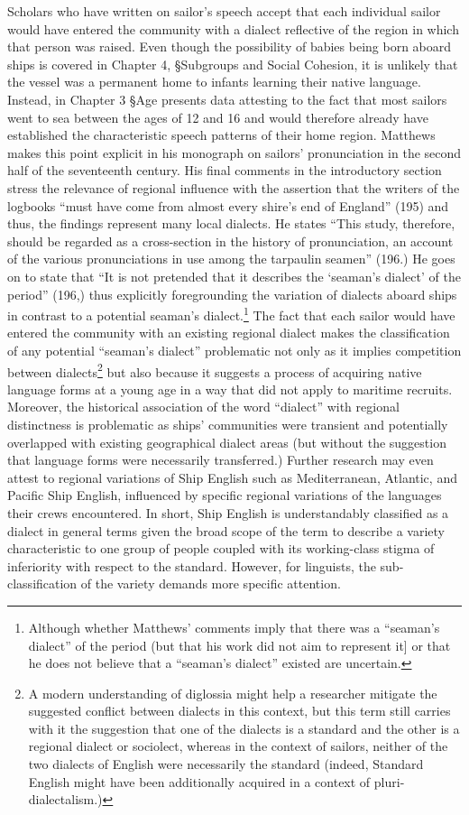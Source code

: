 {Scholars who have written on sailor’s speech accept that each individual sailor would have entered the community with a dialect reflective of the region in which that person was raised.} Even though the possibility of babies being born aboard ships is covered in Chapter 4, §Subgroups and Social Cohesion, it is unlikely that the vessel was a permanent home to infants learning their native language. Instead, in Chapter 3 §Age presents data attesting to the fact that most sailors went to sea between the ages of 12 and 16 and would therefore already have established the characteristic speech patterns of their home region. Matthews makes this point explicit in his monograph on sailors’ pronunciation in the second half of the seventeenth century. His final comments in the introductory section stress the relevance of regional influence with the assertion that the writers of the logbooks “must have come from almost every shire’s end of England” (195) and thus, the findings represent many local dialects. He states “This study, therefore, should be regarded as a cross-section in the history of pronunciation, an account of the various pronunciations in use among the tarpaulin seamen” (196.) He goes on to state that “It is not pretended that it describes the ‘seaman’s dialect’ of the period” (196,) thus explicitly foregrounding the variation of dialects aboard ships in contrast to a potential seaman’s dialect.\footnote{Although whether Matthews’ comments imply that there was a “seaman’s dialect” of the period (but that his work did not aim to represent it] or that he does not believe that a “seaman’s dialect” existed are uncertain.}  The fact that each sailor would have entered the community with an existing regional dialect makes the classification of any potential “seaman’s dialect” problematic not only as it implies competition between dialects\footnote{A modern understanding of diglossia might help a researcher mitigate the suggested conflict between dialects in this context, but this term still carries with it the suggestion that one of the dialects is a standard and the other is a regional dialect or sociolect, whereas in the context of sailors, neither of the two dialects of English were necessarily the standard (indeed, Standard English might have been additionally acquired in a context of pluri-dialectalism.)}  but also because it suggests a process of acquiring native language forms at a young age in a way that did not apply to maritime recruits. Moreover, the historical association of the word “dialect” with regional distinctness is problematic as ships’ communities were transient and potentially overlapped with existing geographical dialect areas (but without the suggestion that language forms were necessarily transferred.) Further research may even attest to regional variations of Ship English such as Mediterranean, Atlantic, and Pacific Ship English, influenced by specific regional variations of the languages their crews encountered. In short, Ship English is understandably classified as a dialect in general terms given the broad scope of the term to describe a variety characteristic to one group of people coupled with its working-class stigma of inferiority with respect to the standard. However, for linguists, the sub-classification of the variety demands more specific attention. 


